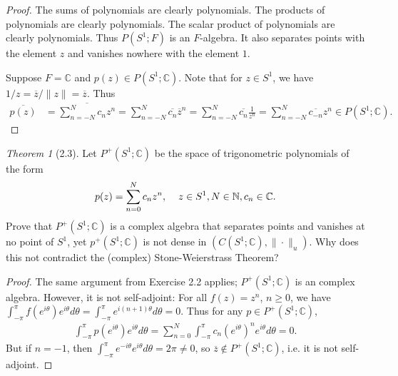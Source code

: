 \documentclass[12pt]{article}
\theoremstyle{remark}
\theoremstyle{named}
\newtheorem*{theorem}{Theorem}
\renewcommand{\t}{\theta}
\newcommand{\N}{\mathbb N}
\newcommand{\C}{\mathbb C}
\begin{document}
\begin{proof}
    The sums of polynomials are clearly polynomials. The products of polynomials are clearly polynomials. The scalar product of polynomials are clearly polynomials. Thus \(P(S^1;F)\) is an \(F\)-algebra. It also separates points with the element \(z\) and vanishes nowhere with the element \(1\).

    Suppose \(F = \C\) and \(p(z) \in P(S^1;\C)\). Note that for \(z \in S^1\), we have \(1/z = \overline{z} / \|z\| = \overline{z}\). Thus
    \begin{align*}
        \overline{p(z)} &= \overline{\sum_{n = -N}^{N} c_n z^n} = \sum_{n = -N}^{N} \overline{c_n} \overline{z}^n = \sum_{n = -N}^{N} \overline{c_n} \frac{1}{z^n} = \sum_{n = -N}^{N} \overline{c_{-n}} z^n \in P(S^1;\C).
    \end{align*}
\end{proof}

\begin{theorem}[2.3]
    Let \(P^+(S^1;\C)\) be the space of trigonometric polynomials of the form
    \begin{align*}
        p(z) = \sum_{n = 0}^{N} c_n z^n, \hspace*{4mm} z \in S^1, N \in \N, c_n \in \C.
    \end{align*}
    Prove that \(P^+(S^1;\C)\) is a complex algebra that separates points and vanishes at no point of \(S^1\), yet \(p^+(S^1;\C)\) is not dense in \((C(S^1;\C), \|\cdot\|_u)\). Why does this not contradict the (complex) Stone-Weierstrass Theorem?
\end{theorem}

\begin{proof}
    The same argument from Exercise 2.2 applies; \(P^+(S^1;\C)\) is an complex algebra. However, it is not self-adjoint: For all \(f(z) = z^n\), \(n \geq 0\), we have \(\int_{-\pi}^{\pi} f(e^{i\t}) e^{i\t} d\t = \int_{-\pi}^{\pi} e^{i(n + 1)\t}d\t = 0\). Thus for any \(p \in P^+(S^1;\C)\), 
    \begin{align*}
        \int_{-\pi}^{\pi} p(e^{i\t}) e^{i\t} d\t = \sum_{n = 0}^{N} \int_{-\pi}^{\pi} c_n (e^{i\t})^n e^{i\t} d\t = 0.
    \end{align*}
    But if \(n = -1\), then \(\int_{-\pi}^{\pi} e^{-i\t}e^{i\t}d\t = 2\pi \neq 0\), so \(\overline{z} \notin P^+(S^1;\C)\), i.e. it is not self-adjoint.
\end{proof}
\end{document}
